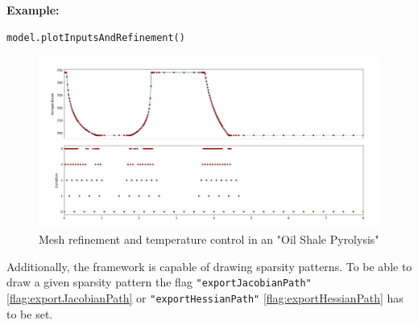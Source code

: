 \documentclass[12pt]{article}
\begin{document}
\begin{mdframed}[backgroundcolor=gray!10, roundcorner=10pt,
		linewidth=1pt]
	\textbf{Example:}
\begin{lstlisting}
model.plotInputsAndRefinement()
\end{lstlisting}
\begin{figure}[H]
	\centering
	\includegraphics[width=1\textwidth]{images/refinement.png}
	\caption{Mesh refinement and temperature control in an "Oil Shale Pyrolysis"}
	\label{fig:osp}
\end{figure}
\end{mdframed}

Additionally, the framework is capable of drawing sparsity patterns. To be able to draw a given sparsity pattern the flag \texttt{"exportJacobianPath"} \eqref{flag:exportJacobianPath} or \texttt{"exportHessianPath"} \eqref{flag:exportHessianPath} has to be set.
\end{document}
